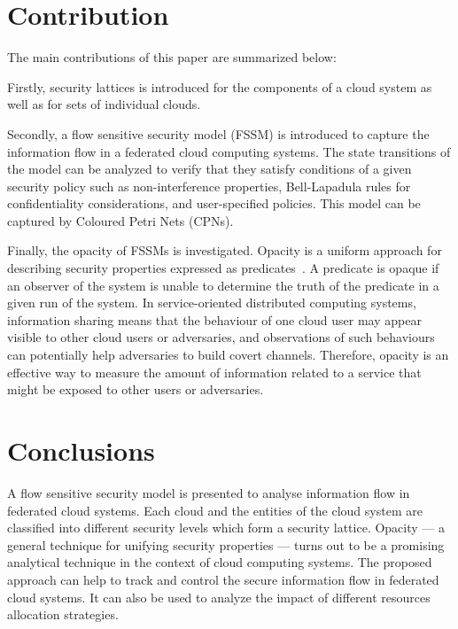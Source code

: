 \documentclass[conference]{IEEEtran}
\begin{document}
 
\section{Contribution}

The main contributions of this paper are summarized below: 

Firstly, security lattices is introduced for the components 
of a cloud system as well as for sets of individual clouds.

Secondly, a flow sensitive security model (FSSM) is 
introduced to capture the information flow in 
a federated cloud computing systems. The state transitions of 
the model can  be analyzed to verify that they satisfy 
conditions of a given security policy such as non-interference 
properties, Bell-Lapadula rules for confidentiality considerations, 
and user-specified policies. This model can be captured by Coloured Petri Nets (CPNs).

Finally, the opacity of FSSMs is investigated. 
Opacity is a uniform approach for
describing security properties expressed as predicates~\cite{Bryans2008}. 
A predicate is opaque if an observer of the system is unable to
determine the truth of the predicate in a given run of the system. 
In  service-oriented distributed computing systems, 
information sharing means that the behaviour of one cloud user 
may appear visible to other cloud users or adversaries, and
observations of such behaviours can potentially help adversaries
to build covert channels. Therefore, opacity is an
effective way  to 
measure the amount of information related to a service 
that might be exposed to other users or adversaries.

\section{Conclusions}\label{sec:conclusion}

A flow sensitive security model is presented 
to analyse information
flow in federated cloud systems. Each cloud and the 
entities of the cloud system are classified into
different security levels which form a security lattice. 
Opacity --- a general technique for unifying
security properties --- turns out to be a promising 
analytical technique in the context of cloud computing systems.
The proposed approach can help to track and control 
the secure information flow in federated
cloud systems. It  can also be used to analyze
the impact of different resources allocation strategies.





\end{document}
